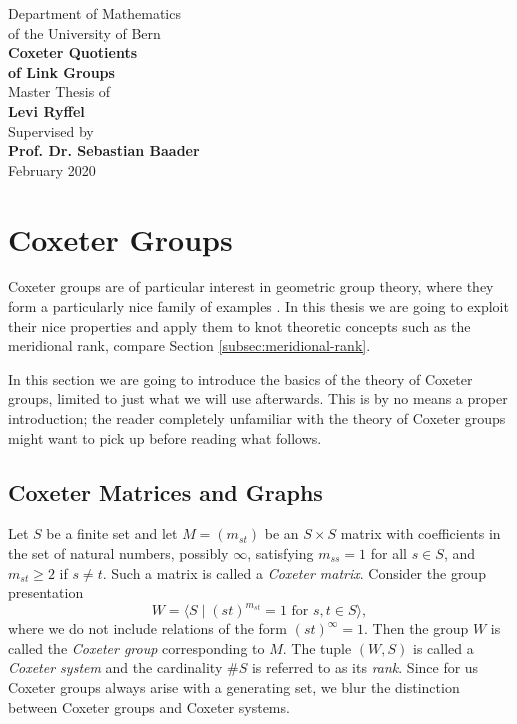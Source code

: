 \documentclass{article}
\theoremstyle{definition}
\begin{document}
\begin{titlepage}
\begin{center}
\Large{Department of Mathematics \\ of the University of Bern}\\
\vspace*{3.5cm}
\Huge{\textbf{Coxeter Quotients \\ of Link Groups}}\\
\vspace*{6.5cm}
\Large{Master Thesis of} \\ \Large{\textbf{Levi Ryffel}}\\
\vspace*{.25cm}
Supervised by \\ \textbf{Prof. Dr. Sebastian Baader}\\
\vspace*{2cm}
February 2020
\end{center}
\end{titlepage}

\tableofcontents
\newpage

\section{Coxeter Groups}
Coxeter groups are of particular interest in geometric group theory, where they form a particularly nice family of examples \cite{davis2008}.
In this thesis we are going to exploit their nice properties and apply them to knot theoretic concepts such as the meridional rank, compare Section \ref{subsec:meridional-rank}.

In this section we are going to introduce the basics of the theory of Coxeter groups, limited to just what we will use afterwards. This is by no means a proper introduction; the reader completely unfamiliar with the theory of Coxeter groups might want to pick up \cite{humphreys1990} before reading what follows.

\subsection{Coxeter Matrices and Graphs}
Let $S$ be a finite set and let $M = (m_{st})$ be an $S \times S$ matrix with coefficients in the set of natural numbers, possibly $\infty$, satisfying $m_{ss} = 1$ for all $s \in S$, and $m_{st} \geq 2$ if $s \ne t$. Such a matrix is called a \textit{Coxeter matrix}. Consider the group presentation
$$W = \langle S \; | \; (st)^{m_{st}} = 1 \text{ for } s,t\in S \rangle,$$
where we do not include relations of the form $(st)^\infty = 1$.
Then the group $W$ is called the \textit{Coxeter group} corresponding to $M$. The tuple $(W,S)$ is called a \textit{Coxeter system} and the cardinality $\#S$ is referred to as its \textit{rank}. Since for us Coxeter groups always arise with a generating set, we blur the distinction between Coxeter groups and Coxeter systems.
\end{document}
